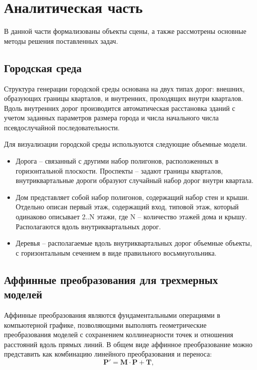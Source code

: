 \chapter{Аналитическая часть}

В данной части формализованы объекты сцены, а также рассмотрены основные методы решения поставленных задач.

\section{Городская среда}

Структура генерации городской среды основана на двух типах дорог: внешних, образующих границы кварталов, и внутренних, проходящих внутри кварталов. Вдоль внутренних дорог производится автоматическая расстановка зданий с учетом заданных параметров размера города и числа начального числа псевдослучайной последовательности.

Для визуализации городской среды используются следующие объемные модели.
\begin{itemize}
    \item Дорога -- связанный с другими набор полигонов, расположенных в горизонтальной плоскости. Проспекты -- задают границы кварталов, внутриквартальные дороги образуют случайный набор дорог внутри квартала.
    \item Дом представляет собой набор полигонов, содержащий набор стен и крыши. Отдельно описан первый этаж, содержащий вход, типовой этаж, который одинаково описывает 2..N этажи, где N -- количество этажей дома и крышу. Располагаются вдоль внутриквартальных дорог.
    \item Деревья -- располагаемые вдоль внутриквартальных дорог объемные объекты, с горизонтальным сечением в виде правильного восьмиугольника.
\end{itemize}


\section{Аффинные преобразования для трехмерных моделей}
Аффинные преобразования являются фундаментальными операциями в компьютерной графике, позволяющими выполнять геометрические преобразования моделей с сохранением коллинеарности точек и отношения расстояний вдоль прямых линий. В общем виде аффинное преобразование можно представить как комбинацию линейного преобразования и переноса:
\begin{equation}
	\mathbf{P}' = \mathbf{M} \cdot \mathbf{P} + \mathbf{T},
\end{equation}

